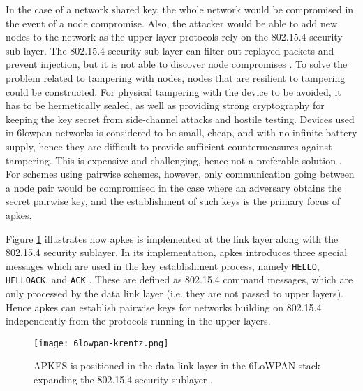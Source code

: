In the case of a network shared key, the whole network would be compromised in the event of a node compromise. Also, the attacker would be able to add new nodes to the network as the upper-layer protocols rely on the 802.15.4 security sub-layer. The 802.15.4 security sub-layer can filter out replayed packets and prevent injection, but it is not able to discover node compromises \cite{krentz20136lowpan}. To solve the problem related to tampering with nodes, nodes that are resilient to tampering could be constructed. For physical tampering with the device to be avoided, it has to be hermetically sealed, as well as providing strong cryptography for keeping the key secret from side-channel attacks and hostile testing. Devices used in \gls{6lowpan} networks is considered to be small, cheap, and with no infinite battery supply, hence they are difficult to provide sufficient countermeasures against tampering. This is expensive and challenging, hence not a preferable solution \cite{anderson1996tamper}. For schemes using pairwise schemes, however, only communication going between a node pair would be compromised in the case where an adversary obtains the secret pairwise key, and the establishment of such keys is the primary focus of \gls{apkes}.

Figure \ref{fig:6lowpan-krentz} illustrates how \gls{apkes} is implemented at the link layer along with the 802.15.4 security sublayer. In its implementation, \gls{apkes} introduces three special messages which are used in the key establishment process, namely \texttt{HELLO}, \texttt{HELLOACK}, and \texttt{ACK} \cite{krentz20136lowpan}. These are defined as 802.15.4 command messages, which are only processed by the data link layer (i.e. they are not passed to upper layers). Hence \gls{apkes} can establish pairwise keys for networks building on 802.15.4 independently from the protocols running in the upper layers.

\begin{figure}
	\centering
	\texttt{[image: 6lowpan-krentz.png]}
	\caption{APKES is positioned in the data link layer in the 6LoWPAN stack expanding the 802.15.4 security sublayer \cite{krentz20136lowpan}.}
	\label{fig:6lowpan-krentz}
\end{figure}

